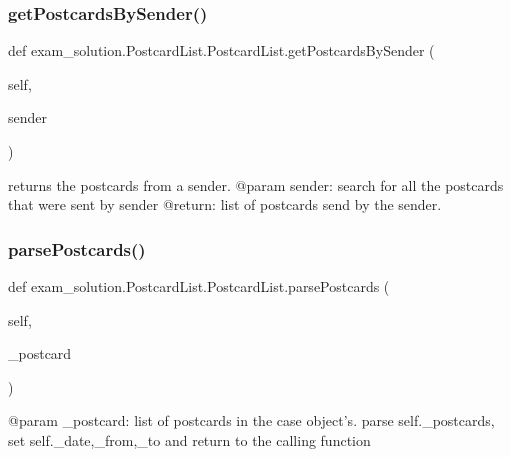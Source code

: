 \subsubsection{\texorpdfstring{getPostcardsBySender()}{getPostcardsBySender()}}
{\footnotesize\ttfamily def exam\+\_\+solution.\+Postcard\+List.\+Postcard\+List.\+get\+Postcards\+By\+Sender (\begin{DoxyParamCaption}\item[{}]{self,  }\item[{}]{sender }\end{DoxyParamCaption})}

\begin{DoxyVerb}returns the postcards from a sender.
@param sender: search for all the postcards
that were sent by sender
@return: list of postcards send by the sender.
\end{DoxyVerb}
 \mbox{\label{classexam__solution_1_1PostcardList_1_1PostcardList_acebfaabbe6000634ecfdac02406865b8}} 
\subsubsection{\texorpdfstring{parsePostcards()}{parsePostcards()}}
{\footnotesize\ttfamily def exam\+\_\+solution.\+Postcard\+List.\+Postcard\+List.\+parse\+Postcards (\begin{DoxyParamCaption}\item[{}]{self,  }\item[{}]{\+\_\+postcard }\end{DoxyParamCaption})}

\begin{DoxyVerb}@param _postcard: list of postcards in the case object's.
parse self._postcards, set self.{_date,_from,_to}
and  return to the calling function
\end{DoxyVerb}
 \mbox{\label{classexam__solution_1_1PostcardList_1_1PostcardList_a6cd8c12f1e3a2da78f0290eef2a21261}} 
